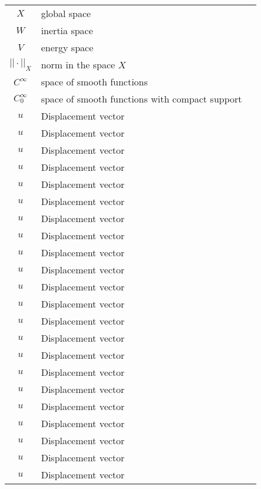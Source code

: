 \documentclass[main.tex]{subfiles}
\begin{document}
\begin{tabularx}{\textwidth}{cXr}
\( X \) & global space & \pageref{sym:Xspace} \\
\( W \) & inertia space & \pageref{sym:Wspace} \\
\( V \) & energy space & \pageref{sym:Vspace} \\
\( ||\cdot||_X \) & norm in the space $X$ & \pageref{sym:norm} \\
\( C^\infty \) & space of smooth functions & \pageref{sym:Cinfty} \\
\( C^\infty_0 \) & space of smooth functions with compact support & \pageref{sym:Cinftyzero} \\
\( u \) & Displacement vector & \pageref{sym:u} \\
\( u \) & Displacement vector & \pageref{sym:u} \\
\( u \) & Displacement vector & \pageref{sym:u} \\
\( u \) & Displacement vector & \pageref{sym:u} \\
\( u \) & Displacement vector & \pageref{sym:u} \\
\( u \) & Displacement vector & \pageref{sym:u} \\
\( u \) & Displacement vector & \pageref{sym:u} \\
\( u \) & Displacement vector & \pageref{sym:u} \\
\( u \) & Displacement vector & \pageref{sym:u} \\
\( u \) & Displacement vector & \pageref{sym:u} \\
\( u \) & Displacement vector & \pageref{sym:u} \\
\( u \) & Displacement vector & \pageref{sym:u} \\
\( u \) & Displacement vector & \pageref{sym:u} \\
\( u \) & Displacement vector & \pageref{sym:u} \\
\( u \) & Displacement vector & \pageref{sym:u} \\
\( u \) & Displacement vector & \pageref{sym:u} \\
\( u \) & Displacement vector & \pageref{sym:u} \\
\( u \) & Displacement vector & \pageref{sym:u} \\
\( u \) & Displacement vector & \pageref{sym:u} \\
\( u \) & Displacement vector & \pageref{sym:u} \\
\( u \) & Displacement vector & \pageref{sym:u} \\
\( u \) & Displacement vector & \pageref{sym:u} \\

\end{tabularx}
\end{document}

